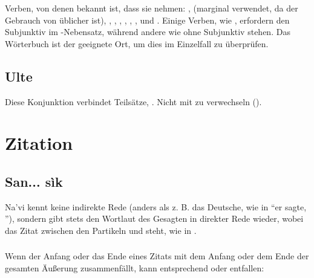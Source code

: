 \subsubsection{} Verben, von denen bekannt ist, dass sie  nehmen: ,  (marginal verwendet, da der Gebrauch von  üblicher ist), , , , , , ,  und . Einige Verben, wie  , erfordern den Subjunktiv im -Nebensatz, während andere wie   ohne Subjunktiv stehen. Das Wörterbuch ist der geeignete Ort, um dies im Einzelfall zu überprüfen.

\subsection{Ulte} Diese Konjunktion verbindet Teilsätze,  . Nicht mit  zu verwechseln  ().
\label{syn:ulte}

\section{Zitation}
\label{syn:direct-quote}

\subsection{San... sìk} Na'vi kennt keine indirekte Rede (anders als z. B. das Deutsche, wie in ``er sagte, ''), sondern gibt stets den Wortlaut des Gesagten in direkter Rede wieder, wobei das Zitat zwischen den Partikeln  und  steht, wie in  . 

\subsubsection{} Wenn der Anfang oder das Ende eines Zitats mit dem Anfang oder dem Ende der gesamten Äußerung zusammenfällt, kann entsprechend  oder  entfallen:

